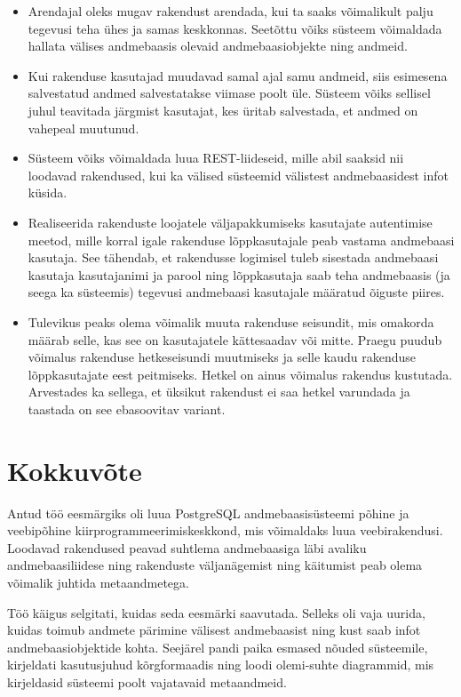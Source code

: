 \documentclass[a4paper,12pt]{article} %
\begin{document}
\begin{itemize}
\item Arendajal oleks mugav rakendust arendada, kui ta saaks võimalikult palju tegevusi teha ühes ja samas keskkonnas. Seetõttu võiks süsteem võimaldada hallata välises andmebaasis olevaid andmebaasiobjekte ning andmeid.
\item Kui rakenduse kasutajad muudavad samal ajal samu andmeid, siis esimesena salvestatud andmed salvestatakse viimase poolt üle. Süsteem võiks sellisel juhul teavitada järgmist kasutajat, kes üritab salvestada, et andmed on vahepeal muutunud.
\item Süsteem võiks võimaldada luua REST-liideseid, mille abil saaksid nii loodavad rakendused, kui ka välised süsteemid välistest andmebaasidest infot küsida.
\item Realiseerida rakenduste loojatele väljapakkumiseks kasutajate autentimise meetod, mille korral igale rakenduse lõppkasutajale peab vastama andmebaasi kasutaja. See tähendab, et rakendusse logimisel tuleb sisestada andmebaasi kasutaja kasutajanimi ja parool ning lõppkasutaja saab teha andmebaasis (ja seega ka süsteemis) tegevusi andmebaasi kasutajale määratud õiguste piires.
\item Tulevikus peaks olema võimalik muuta rakenduse seisundit, mis omakorda määrab selle, kas see on kasutajatele kättesaadav või mitte. Praegu puudub võimalus rakenduse hetkeseisundi muutmiseks ja selle kaudu rakenduse lõppkasutajate eest peitmiseks. Hetkel on ainus võimalus rakendus kustutada. Arvestades ka sellega, et üksikut rakendust ei saa hetkel varundada ja taastada on see ebasoovitav variant.

\end{itemize}

\section{Kokkuvõte}
Antud töö eesmärgiks oli luua PostgreSQL andmebaasisüsteemi põhine ja veebipõhine kiirprogrammeerimiskeskkond, mis võimaldaks luua veebirakendusi. Loodavad rakendused peavad suhtlema andmebaasiga läbi avaliku andmebaasiliidese ning rakenduste väljanägemist ning käitumist peab olema võimalik juhtida metaandmetega.\par

Töö käigus selgitati, kuidas seda eesmärki saavutada. Selleks oli vaja uurida, kuidas toimub andmete pärimine välisest andmebaasist ning kust saab infot andmebaasiobjektide kohta. Seejärel pandi paika esmased nõuded süsteemile, kirjeldati kasutusjuhud kõrgformaadis ning loodi olemi-suhte diagrammid, mis kirjeldasid süsteemi poolt vajatavaid metaandmeid.\par
\end{document}
